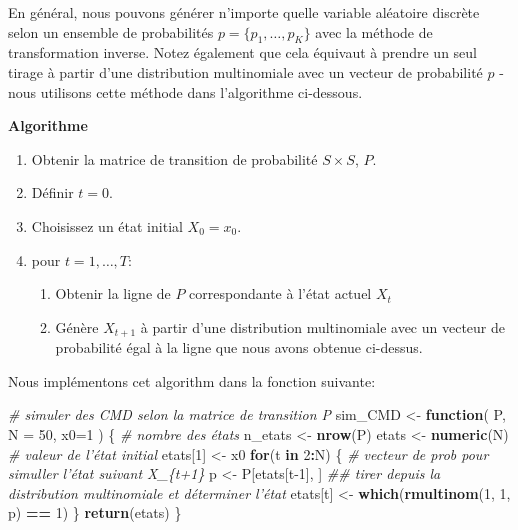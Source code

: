 \documentclass[
]{book}
\newenvironment{Shaded}{\begin{snugshade}}{\end{snugshade}}
\newcommand{\CommentTok}[1]{\textcolor[rgb]{0.56,0.35,0.01}{\textit{#1}}}
\newcommand{\ControlFlowTok}[1]{\textcolor[rgb]{0.13,0.29,0.53}{\textbf{#1}}}
\newcommand{\DataTypeTok}[1]{\textcolor[rgb]{0.13,0.29,0.53}{#1}}
\newcommand{\DecValTok}[1]{\textcolor[rgb]{0.00,0.00,0.81}{#1}}
\newcommand{\KeywordTok}[1]{\textcolor[rgb]{0.13,0.29,0.53}{\textbf{#1}}}
\newcommand{\NormalTok}[1]{#1}
\newcommand{\OperatorTok}[1]{\textcolor[rgb]{0.81,0.36,0.00}{\textbf{#1}}}
\newcommand{\StringTok}[1]{\textcolor[rgb]{0.31,0.60,0.02}{#1}}
\providecommand{\tightlist}{%
  \setlength{\itemsep}{0pt}\setlength{\parskip}{0pt}}
\theoremstyle{definition}
\theoremstyle{definition}
\theoremstyle{definition}
\theoremstyle{remark}
\begin{document}
En général, nous pouvons générer n'importe quelle variable aléatoire discrète selon un ensemble de probabilités \(p = \{p_1,\ldots, p_K\}\) avec la méthode de transformation inverse. Notez également que cela équivaut à prendre un seul tirage à partir d'une distribution multinomiale avec un vecteur de probabilité \(p\) - nous utilisons cette méthode dans l'algorithme ci-dessous.

\textbf{Algorithme}

\begin{enumerate}
\def\labelenumi{\arabic{enumi}.}
\tightlist
\item
  Obtenir la matrice de transition de probabilité \(S\times S\), \(P\).
\item
  Définir \(t=0\).
\item
  Choisissez un état initial \(X_0 = x_0\).
\item
  pour \(t=1, \ldots , T\):

  \begin{enumerate}
  \def\labelenumii{\alph{enumii})}
  \tightlist
  \item
    Obtenir la ligne de \(P\) correspondante à l'état actuel \(X_t\)
  \item
    Génère \(X_{t + 1}\) à partir d'une distribution multinomiale avec un vecteur de probabilité égal à la ligne que nous avons obtenue ci-dessus.
  \end{enumerate}
\end{enumerate}

Nous implémentons cet algorithm dans la fonction suivante:

\begin{Shaded}
\begin{Highlighting}[]
\CommentTok{# simuler des CMD selon la matrice de transition P}
\NormalTok{sim_CMD <-}\StringTok{ }\ControlFlowTok{function}\NormalTok{( P, }\DataTypeTok{N =} \DecValTok{50}\NormalTok{, }\DataTypeTok{x0=}\DecValTok{1}\NormalTok{ ) \{}
  \CommentTok{# nombre des états}
\NormalTok{  n_etats <-}\StringTok{ }\KeywordTok{nrow}\NormalTok{(P)}
\NormalTok{  etats <-}\StringTok{ }\KeywordTok{numeric}\NormalTok{(N)}
  \CommentTok{# valeur de l'état initial }
\NormalTok{  etats[}\DecValTok{1}\NormalTok{] <-}\StringTok{ }\NormalTok{x0}
  \ControlFlowTok{for}\NormalTok{(t }\ControlFlowTok{in} \DecValTok{2}\OperatorTok{:}\NormalTok{N) \{}
    \CommentTok{# vecteur de prob pour simuller l'état suivant X_\{t+1\}}
\NormalTok{    p <-}\StringTok{ }\NormalTok{P[etats[t}\DecValTok{-1}\NormalTok{], ]}
    \CommentTok{## tirer depuis la distribution multinomiale et déterminer l'état}
\NormalTok{    etats[t] <-}\StringTok{ }\KeywordTok{which}\NormalTok{(}\KeywordTok{rmultinom}\NormalTok{(}\DecValTok{1}\NormalTok{, }\DecValTok{1}\NormalTok{, p) }\OperatorTok{==}\StringTok{ }\DecValTok{1}\NormalTok{)}
\NormalTok{  \}}
  \KeywordTok{return}\NormalTok{(etats)}
\NormalTok{\}}
\end{Highlighting}
\end{Shaded}
\end{document}
